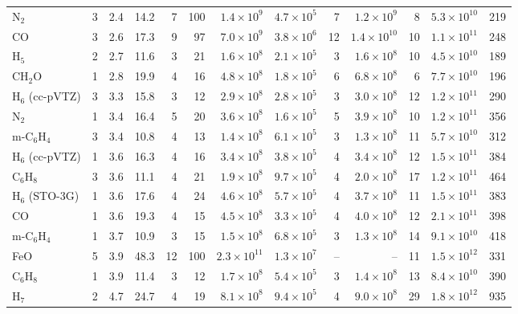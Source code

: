 \begin{table}[!htbp]
\begin{tabular}{lrrrrrrrrrrrr}
N$_2$ & 3 & 2.4 & 14.2 & 7 & 100 & $1.4\times10^{9}$ & $4.7\times10^{5}$ & 7 & $1.2\times10^{9}$ & 8 & $5.3\times10^{10}$ & 219 \\
CO & 3 & 2.6 & 17.3 & 9 & 97 & $7.0\times10^{9}$ & $3.8\times10^{6}$ & 12 & $1.4\times10^{10}$ & 10 & $1.1\times10^{11}$ & 248 \\
H$_5$ & 2 & 2.7 & 11.6 & 3 & 21 & $1.6\times10^{8}$ & $2.1\times10^{5}$ & 3 & $1.6\times10^{8}$ & 10 & $4.5\times10^{10}$ & 189 \\
CH$_2$O & 1 & 2.8 & 19.9 & 4 & 16 & $4.8\times10^{8}$ & $1.8\times10^{5}$ & 6 & $6.8\times10^{8}$ & 6 & $7.7\times10^{10}$ & 196 \\
H$_6$ (cc-pVTZ) & 3 & 3.3 & 15.8 & 3 & 12 & $2.9\times10^{8}$ & $2.8\times10^{5}$ & 3 & $3.0\times10^{8}$ & 12 & $1.2\times10^{11}$ & 290 \\
N$_2$ & 1 & 3.4 & 16.4 & 5 & 20 & $3.6\times10^{8}$ & $1.6\times10^{5}$ & 5 & $3.9\times10^{8}$ & 10 & $1.2\times10^{11}$ & 356 \\
m-C$_6$H$_4$ & 3 & 3.4 & 10.8 & 4 & 13 & $1.4\times10^{8}$ & $6.1\times10^{5}$ & 3 & $1.3\times10^{8}$ & 11 & $5.7\times10^{10}$ & 312 \\
H$_6$ (cc-pVTZ) & 1 & 3.6 & 16.3 & 4 & 16 & $3.4\times10^{8}$ & $3.8\times10^{5}$ & 4 & $3.4\times10^{8}$ & 12 & $1.5\times10^{11}$ & 384 \\
C$_6$H$_8$ & 3 & 3.6 & 11.1 & 4 & 21 & $1.9\times10^{8}$ & $9.7\times10^{5}$ & 4 & $2.0\times10^{8}$ & 17 & $1.2\times10^{11}$ & 464 \\
H$_6$ (STO-3G) & 1 & 3.6 & 17.6 & 4 & 24 & $4.6\times10^{8}$ & $5.7\times10^{5}$ & 4 & $3.7\times10^{8}$ & 11 & $1.5\times10^{11}$ & 383 \\
CO & 1 & 3.6 & 19.3 & 4 & 15 & $4.5\times10^{8}$ & $3.3\times10^{5}$ & 4 & $4.0\times10^{8}$ & 12 & $2.1\times10^{11}$ & 398 \\
m-C$_6$H$_4$ & 1 & 3.7 & 10.9 & 3 & 15 & $1.5\times10^{8}$ & $6.8\times10^{5}$ & 3 & $1.3\times10^{8}$ & 14 & $9.1\times10^{10}$ & 418 \\
FeO & 5 & 3.9 & 48.3 & 12 & 100 & $2.3\times10^{11}$ & $1.3\times10^{7}$ & -- & -- & 11 & $1.5\times10^{12}$ & 331 \\
C$_6$H$_8$ & 1 & 3.9 & 11.4 & 3 & 12 & $1.7\times10^{8}$ & $5.4\times10^{5}$ & 3 & $1.4\times10^{8}$ & 13 & $8.4\times10^{10}$ & 390 \\
H$_7$ & 2 & 4.7 & 24.7 & 4 & 19 & $8.1\times10^{8}$ & $9.4\times10^{5}$ & 4 & $9.0\times10^{8}$ & 29 & $1.8\times10^{12}$ & 935 \\

\end{tabular}
\end{table}
